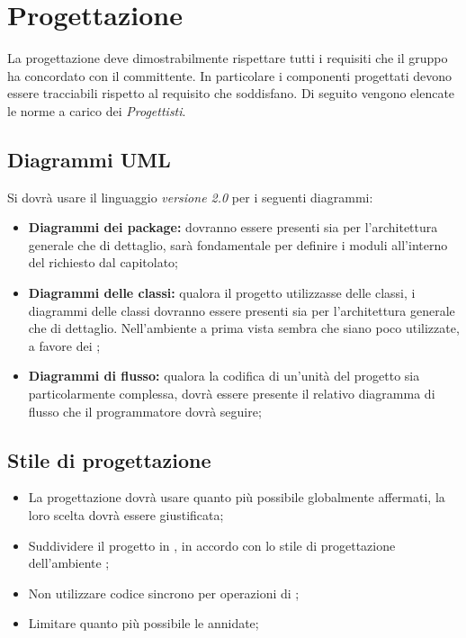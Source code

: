 \section{Progettazione}
La progettazione deve dimostrabilmente rispettare tutti i requisiti che il gruppo ha concordato con il committente. In particolare i componenti progettati devono essere tracciabili rispetto al requisito che soddisfano.
Di seguito vengono elencate le norme a carico dei \emph{Progettisti}.

	\subsection{Diagrammi UML}
	Si dovrà usare il linguaggio  \emph{versione 2.0} per i seguenti diagrammi:
\begin{itemize}
 \item \textbf{Diagrammi dei package:} dovranno essere presenti sia per l'architettura generale che di dettaglio, sarà fondamentale per definire i moduli all'interno del   richiesto dal capitolato;
 \item \textbf{Diagrammi delle classi:} qualora il progetto utilizzasse delle classi, i diagrammi delle classi dovranno essere presenti sia per l'architettura generale che di dettaglio. Nell'ambiente  a prima vista sembra che siano poco utilizzate, a favore dei ;
 \item \textbf{Diagrammi di flusso:} qualora la codifica di un'unità del progetto sia particolarmente complessa, dovrà essere presente il relativo diagramma di flusso che il programmatore dovrà seguire;
\end{itemize}

	\subsection{Stile di progettazione}
	\begin{itemize}
		\item La progettazione dovrà usare quanto più possibile  globalmente affermati, la loro scelta dovrà essere giustificata;
		\item Suddividere il progetto in , in accordo con lo stile di progettazione dell'ambiente ;
		\item Non utilizzare codice sincrono per operazioni di ;
		\item Limitare quanto più possibile le  annidate;
	\end{itemize}


